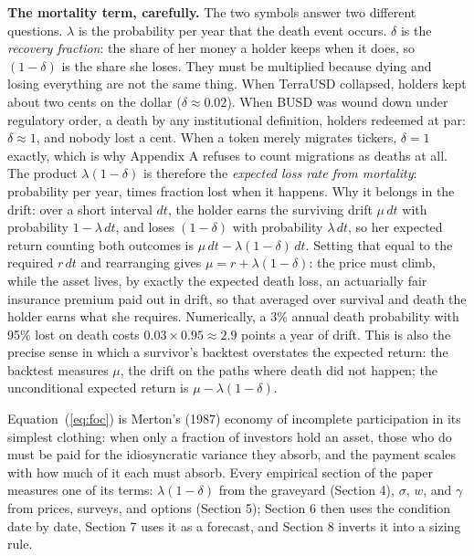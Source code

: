 \documentclass[11pt]{article}
\begin{document}
\textbf{The mortality term, carefully.} The two symbols answer two different questions. $\lambda$ is the probability per year that the death event occurs. $\delta$ is the \emph{recovery fraction}: the share of her money a holder keeps when it does, so $(1-\delta)$ is the share she loses. They must be multiplied because dying and losing everything are not the same thing. When TerraUSD collapsed, holders kept about two cents on the dollar ($\delta \approx 0.02$). When BUSD was wound down under regulatory order, a death by any institutional definition, holders redeemed at par: $\delta \approx 1$, and nobody lost a cent. When a token merely migrates tickers, $\delta = 1$ exactly, which is why Appendix A refuses to count migrations as deaths at all. The product $\lambda(1-\delta)$ is therefore the \emph{expected loss rate from mortality}: probability per year, times fraction lost when it happens. Why it belongs in the drift: over a short interval $dt$, the holder earns the surviving drift $\mu\,dt$ with probability $1-\lambda\,dt$, and loses $(1-\delta)$ with probability $\lambda\,dt$, so her expected return counting both outcomes is $\mu\,dt - \lambda(1-\delta)\,dt$. Setting that equal to the required $r\,dt$ and rearranging gives $\mu = r + \lambda(1-\delta)$: the price must climb, while the asset lives, by exactly the expected death loss, an actuarially fair insurance premium paid out in drift, so that averaged over survival and death the holder earns what she requires. Numerically, a 3\% annual death probability with 95\% lost on death costs $0.03 \times 0.95 \approx 2.9$ points a year of drift. This is also the precise sense in which a survivor's backtest overstates the expected return: the backtest measures $\mu$, the drift on the paths where death did not happen; the unconditional expected return is $\mu - \lambda(1-\delta)$.

Equation~(\ref{eq:foc}) is Merton's (1987) economy of incomplete participation in its simplest clothing: when only a fraction of investors hold an asset, those who do must be paid for the idiosyncratic variance they absorb, and the payment scales with how much of it each must absorb. Every empirical section of the paper measures one of its terms: $\lambda(1-\delta)$ from the graveyard (Section 4), $\sigma$, $w$, and $\gamma$ from prices, surveys, and options (Section 5); Section 6 then uses the condition date by date, Section 7 uses it as a forecast, and Section 8 inverts it into a sizing rule.
\end{document}
